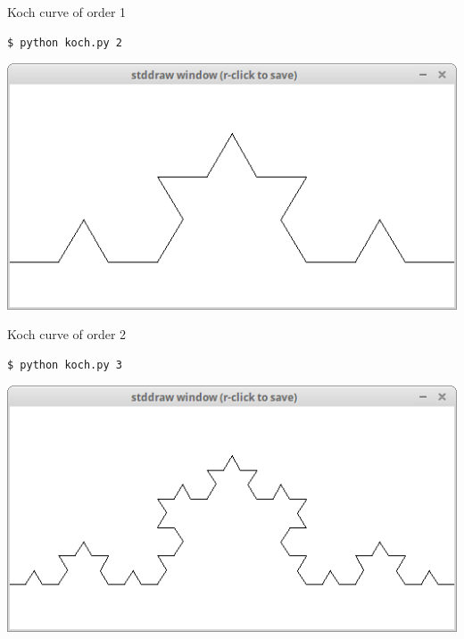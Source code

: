 \documentclass[8pt,a4paper,compress,handout]{beamer}
\begin{document}
\begin{frame}[fragile]
\begin{minipage}{100pt}
\begin{center}
\smallskip

\tiny Koch curve of order 1
\end{center}
\end{minipage}%

\bigskip

\begin{minipage}{200pt}
\begin{lstlisting}[language={}]
$ python koch.py 2
\end{lstlisting}
\end{minipage}%
\hfill
\begin{minipage}{100pt}
\begin{center}
\includegraphics[scale=0.12]{figures/koch3.png}

\smallskip

\tiny Koch curve of order 2
\end{center}
\end{minipage}%

\bigskip

\begin{minipage}{200pt}
\begin{lstlisting}[language={}]
$ python koch.py 3
\end{lstlisting}
\end{minipage}%
\hfill
\begin{minipage}{100pt}
\begin{center}
\includegraphics[scale=0.12]{figures/koch4.png}


\end{center}
\end{minipage}
\end{frame}
\end{document}
